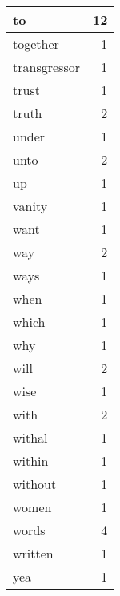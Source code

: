 \begin{center}
\begin{longtable}{l|r}
to & 12\\ \hline 
together & 1\\ \hline 
transgressor & 1\\ \hline 
trust & 1\\ \hline 
truth & 2\\ \hline 
under & 1\\ \hline 
unto & 2\\ \hline 
up & 1\\ \hline 
vanity & 1\\ \hline 
want & 1\\ \hline 
way & 2\\ \hline 
ways & 1\\ \hline 
when & 1\\ \hline 
which & 1\\ \hline 
why & 1\\ \hline 
will & 2\\ \hline 
wise & 1\\ \hline 
with & 2\\ \hline 
withal & 1\\ \hline 
within & 1\\ \hline 
without & 1\\ \hline 
women & 1\\ \hline 
words & 4\\ \hline 
written & 1\\ \hline 
yea & 1\\ \hline 
\end{longtable}  
\end{center}  


  
\normalsize  

  
  

